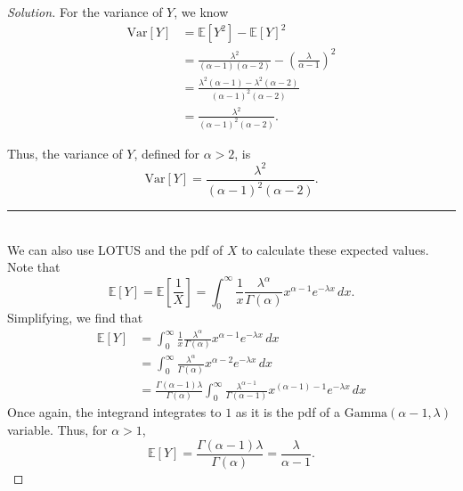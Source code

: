\documentclass[11pt]{article}
\newenvironment{solution}
  {\renewcommand\qedsymbol{$\blacksquare$}\begin{proof}[Solution]}
  {\end{proof}}
\begin{document}
\begin{enumerate}
\begin{enumerate}[a)]
\begin{solution}
		For the variance of $Y$, we know
		\begin{align*}
			\mathrm{Var} \left[Y \right] &= \mathbb{E}\left[Y^2 \right] - \mathbb{E}\left[Y \right]^2 \\
			&= \frac{\lambda^2}{(\alpha - 1)(\alpha - 2)} - \left( \frac{\lambda}{\alpha - 1} \right)^2 \\
			&= \frac{\lambda^2(\alpha - 1) - \lambda^2(\alpha - 2)}{(\alpha - 1)^2(\alpha - 2)} \\
			&= \frac{\lambda^2}{(\alpha - 1)^2(\alpha - 2)}.
		\end{align*}

		Thus, the variance of $Y$, defined for $\alpha > 2$, is 
		\[
			\boxed{\mathrm{Var} \left[Y \right] = \frac{\lambda^2}{(\alpha - 1)^2(\alpha - 2)}}.
		\]
		\noindent\rule{\textwidth}{1pt} \\

		We can also use LOTUS and the pdf of $X$ to calculate these expected values. Note that
		\[
			\mathbb{E}\left[Y \right] = \mathbb{E}\left[\frac{1}{X} \right] = \int_0^{\infty} \frac{1}{x} \frac{\lambda^\alpha}{\Gamma(\alpha)} x^{\alpha - 1} e^{-\lambda x} \, dx.
		\]
		Simplifying, we find that
		\begin{align*}
			\mathbb{E}\left[Y \right] &= \int_0^{\infty} \frac{1}{x} \frac{\lambda^\alpha}{\Gamma(\alpha)} x^{\alpha - 1} e^{-\lambda x} \, dx \\
			&= \int_0^{\infty} \frac{\lambda^\alpha}{\Gamma(\alpha)} x^{\alpha - 2} e^{-\lambda x} \, dx \\
			&= \frac{\Gamma(\alpha - 1)\lambda}{\Gamma(\alpha)} \int_0^{\infty} \frac{\lambda^{\alpha - 1}}{\Gamma(\alpha - 1)} x^{(\alpha - 1) -  1} e^{-\lambda x} \, dx
		\end{align*}
		Once again, the integrand integrates to $1$ as it is the pdf of a $\mathrm{Gamma}(\alpha - 1, \lambda)$ variable. Thus, for $\alpha > 1$,
		\[
			\boxed{\mathbb{E}\left[Y \right] = \frac{\Gamma(\alpha - 1)\lambda}{\Gamma(\alpha)} = \frac{\lambda}{\alpha - 1}}.
		\]


\end{solution}
\end{enumerate}
\end{enumerate}
\end{document}
